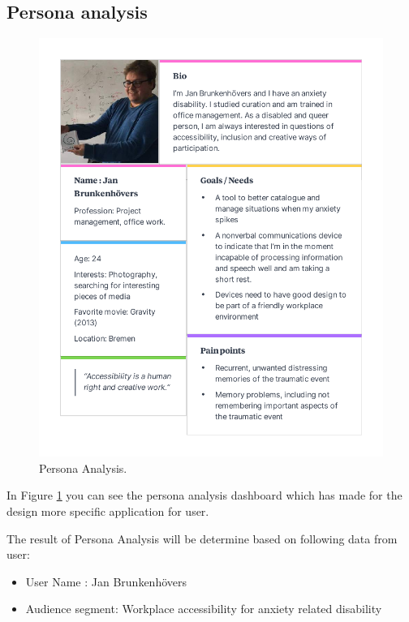 \subsection{Persona analysis}
\begin{figure}[hbt!] 
  \centering
  \includegraphics[width=1.05\linewidth]{chap3/image/persona_jans.pdf}
  \caption[Persona Analysis ]{Persona Analysis.}
  \label{fig:Persona_Analysis}
\end{figure}


In Figure \ref{fig:Persona_Analysis} you can see the persona analysis dashboard which has made for the design more specific application for user.

The result of Persona Analysis will be determine based on following data from user:

\begin{itemize}
    \item User Name : Jan Brunkenhövers
    \item Audience segment: Workplace accessibility for anxiety related disability
\end{itemize}
